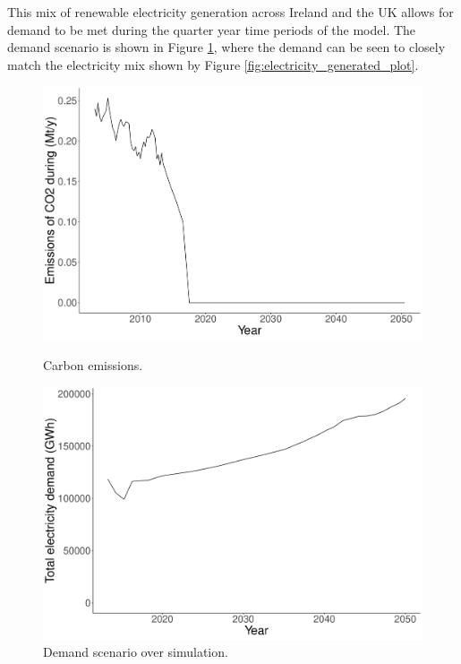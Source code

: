 \documentclass{article}
\begin{document}
This mix of renewable electricity generation across Ireland and the UK allows for demand to be met during the quarter year time periods of the model. The demand scenario is shown in Figure \ref{fig:demand_scenario}, where the demand can be seen to closely match the electricity mix shown by Figure \ref{fig:electricity_generated_plot}.






\begin{figure}[h]
\centering
\begin{minipage}{.5\textwidth}
  \centering
  \includegraphics[width=\linewidth]{figures/emissions_plot.pdf}
  \caption{Carbon emissions.}
  \label{fig:emissions_plot}
\end{minipage}%
\begin{minipage}{.5\textwidth}
  \centering
  \includegraphics[width=\linewidth]{figures/demand_plot.pdf}
  \caption{Demand scenario over simulation.}
  \label{fig:demand_scenario}
\end{minipage}
\end{figure}
\end{document}
